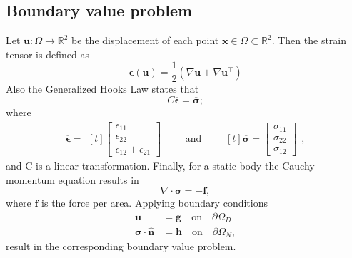 \documentclass[a4paper,english]{elsarticle}%
\begin{document}
\subsection{Boundary value problem}
Let $\boldsymbol{u} : \Omega \rightarrow \mathbb{R}^2$ be the displacement of each point $\boldsymbol{x} \in \Omega \subset \mathbb{R}^2$. Then the strain tensor is defined as 
\begin{equation} \label{eq-strain-tensor}
    \boldsymbol{\epsilon}(\boldsymbol{u}) = \frac{1}{2}(\nabla \boldsymbol{u} + \nabla \boldsymbol{u}^\intercal)
\end{equation}
Also the Generalized Hooks Law states that
\begin{equation}
    C \boldsymbol{\overline{\epsilon}}  = \boldsymbol{\overline{\sigma}};
    \label{hooks-law}
\end{equation}
where 
\begin{equation*}
    \boldsymbol{\overline{\epsilon}} =\begin{aligned}[t]
    \begin{bmatrix}
        \epsilon_{1 1} \\
        \epsilon_{2 2} \\
        \epsilon_{1 2} + \epsilon_{2 1}
    \end{bmatrix}
    \end{aligned}
    \qquad \text{and} \qquad
    \begin{aligned}[t]
        \boldsymbol{\overline{\sigma}} = \begin{bmatrix}
            \sigma_{1 1} \\
            \sigma_{2 2} \\
            \sigma_{1 2} 
        \end{bmatrix}
    \end{aligned},
\end{equation*}
and C is a linear transformation.
Finally, for a static body the Cauchy momentum equation results in 
\begin{equation} \label{eq-cauchy-momentum}
    \nabla \cdot \boldsymbol{\sigma} = -\boldsymbol{f},
\end{equation}
where $\boldsymbol{f}$ is the force per area. Applying boundary conditions 
\begin{align}
    \boldsymbol{u}  &= \boldsymbol{g} \quad \text{on} \quad \partial\Omega_D   \\
    \boldsymbol{\sigma} \cdot \boldsymbol{\hat{n}}  &=  \boldsymbol{h} \quad \text{on} \quad \partial\Omega_N,
    \label{elasticity-bc}
\end{align}
result in the corresponding boundary value problem. 
\end{document}
